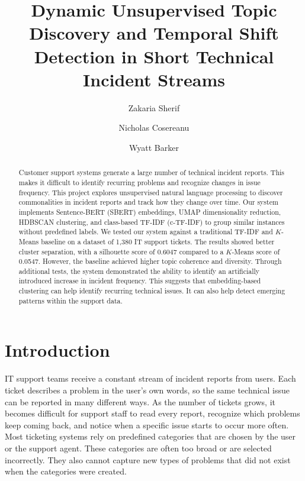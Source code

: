 \documentclass[sigconf,nonacm]{acmart}
\begin{document}
\title{Dynamic Unsupervised Topic Discovery and Temporal Shift Detection in Short Technical Incident Streams}

\author{Zakaria Sherif}

\author{Nicholas Cosereanu}

\author{Wyatt Barker}

\renewcommand{\shortauthors}{Sherif, Cosereanu, and Barker}

\begin{abstract}
Customer support systems generate a large number of technical incident reports. This makes it difficult to identify recurring problems and recognize changes in issue frequency. This project explores unsupervised natural language processing to discover commonalities in incident reports and track how they change over time. Our system implements Sentence-BERT (SBERT) embeddings, UMAP dimensionality reduction, HDBSCAN clustering, and class-based TF-IDF (c-TF-IDF) to group similar instances without predefined labels. We tested our system against a traditional TF-IDF and $K$-Means baseline on a dataset of 1,380 IT support tickets. The results showed better cluster separation, with a silhouette score of 0.6047 compared to a $K$-Means score of 0.0547. However, the baseline achieved higher topic coherence and diversity. Through additional tests, the system demonstrated the ability to identify an artificially introduced increase in incident frequency. This suggests that embedding-based clustering can help identify recurring technical issues. It can also help detect emerging patterns within the support data.
\end{abstract}

\maketitle

\section{Introduction}
IT support teams receive a constant stream of incident reports from users. Each ticket describes a problem in the user's own words, so the same technical issue can be reported in many different ways. As the number of tickets grows, it becomes difficult for support staff to read every report, recognize which problems keep coming back, and notice when a specific issue starts to occur more often. Most ticketing systems rely on predefined categories that are chosen by the user or the support agent. These categories are often too broad or are selected incorrectly. They also cannot capture new types of problems that did not exist when the categories were created.
\end{document}
